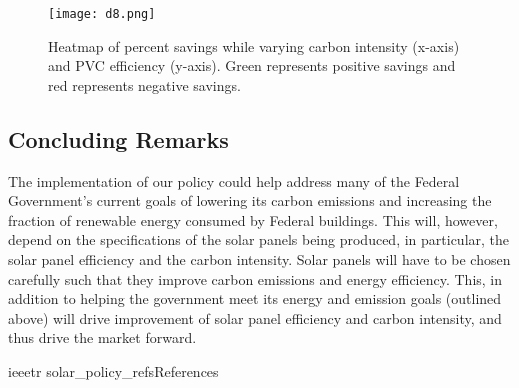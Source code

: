 \begin{figure}
\begin{center}
\texttt{[image: d8.png]}
\caption{Heatmap of percent savings while varying carbon intensity (x-axis) and PVC efficiency (y-axis). Green represents positive savings and red represents negative savings.}
\label{d8}
\end{center}
\end{figure}


\subsection{Concluding Remarks}
The implementation of our policy could help address many of the Federal Government’s current goals of lowering its carbon emissions and increasing the fraction of renewable energy consumed by Federal buildings. This will, however, depend on the specifications of the solar panels being produced, in particular, the solar panel efficiency and the carbon intensity. Solar panels will have to be chosen carefully such that they improve carbon emissions and energy efficiency. This, in addition to helping the government meet its energy and emission goals (outlined above) will drive improvement of solar panel efficiency and carbon intensity, and thus drive the market forward.

\clearpage
{ieeetr}
{solar_policy_refs}{References}
